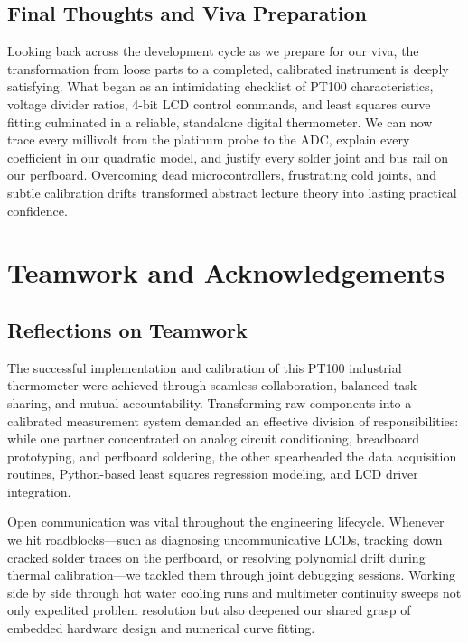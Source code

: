 \documentclass[journal,12pt,onecolumn]{IEEEtran}
\begin{document}
\subsection{Final Thoughts and Viva Preparation}
Looking back across the development cycle as we prepare for our viva, the transformation from loose parts to a completed, calibrated instrument is deeply satisfying. What began as an intimidating checklist of PT100 characteristics, voltage divider ratios, 4-bit LCD control commands, and least squares curve fitting culminated in a reliable, standalone digital thermometer. We can now trace every millivolt from the platinum probe to the ADC, explain every coefficient in our quadratic model, and justify every solder joint and bus rail on our perfboard. Overcoming dead microcontrollers, frustrating cold joints, and subtle calibration drifts transformed abstract lecture theory into lasting practical confidence.

\newpage

\section{Teamwork and Acknowledgements}

\subsection*{Reflections on Teamwork}
The successful implementation and calibration of this PT100 industrial thermometer were achieved through seamless collaboration, balanced task sharing, and mutual accountability. Transforming raw components into a calibrated measurement system demanded an effective division of responsibilities: while one partner concentrated on analog circuit conditioning, breadboard prototyping, and perfboard soldering, the other spearheaded the data acquisition routines, Python-based least squares regression modeling, and LCD driver integration. 

Open communication was vital throughout the engineering lifecycle. Whenever we hit roadblocks—such as diagnosing uncommunicative LCDs, tracking down cracked solder traces on the perfboard, or resolving polynomial drift during thermal calibration—we tackled them through joint debugging sessions. Working side by side through hot water cooling runs and multimeter continuity sweeps not only expedited problem resolution but also deepened our shared grasp of embedded hardware design and numerical curve fitting.
\end{document}
